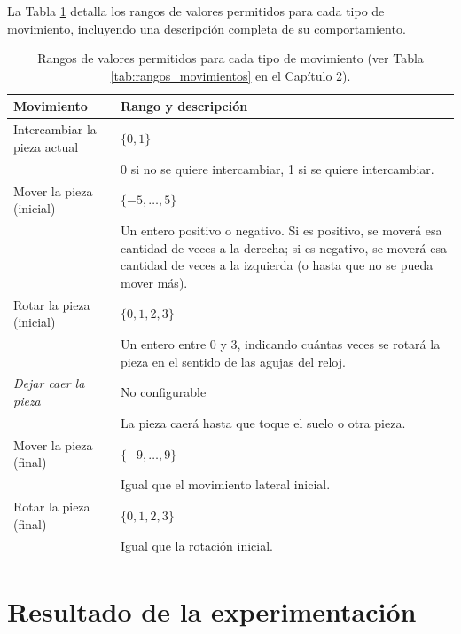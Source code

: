 \documentclass[11pt,spanish,listoffigures,listoftables]{tfgetsinf}
\begin{document}
La Tabla \ref{tab:rangos_movimientos_appendix} detalla los rangos de valores permitidos para cada tipo de movimiento, incluyendo una descripción completa de su comportamiento.

\begin{table}[H]
    \centering
    \begin{tabular}{lp{8cm}}
        \toprule
        \textbf{Movimiento} & \textbf{Rango y descripción} \\
        \midrule
        Intercambiar la pieza actual & $\{0, 1\}$ \\ 
        & 0 si no se quiere intercambiar, 1 si se quiere intercambiar. \\
        \midrule
        Mover la pieza (inicial) & $\{-5, \dots, 5\}$ \\ 
        & Un entero positivo o negativo. Si es positivo, se moverá esa cantidad de veces a la derecha; si es negativo, se moverá esa cantidad de veces a la izquierda (o hasta que no se pueda mover más). \\
        \midrule
        Rotar la pieza (inicial) & $\{0, 1, 2, 3\}$ \\ 
        & Un entero entre 0 y 3, indicando cuántas veces se rotará la pieza en el sentido de las agujas del reloj. \\
        \midrule
        \textit{Dejar caer la pieza} & No configurable \\ 
        & La pieza caerá hasta que toque el suelo o otra pieza. \\
        \midrule
        Mover la pieza (final) & $\{-9, \dots, 9\}$ \\ 
        & Igual que el movimiento lateral inicial. \\
        \midrule
        Rotar la pieza (final) & $\{0, 1, 2, 3\}$ \\ 
        & Igual que la rotación inicial. \\
        \bottomrule
    \end{tabular}
    \caption{Rangos de valores permitidos para cada tipo de movimiento (ver Tabla \ref{tab:rangos_movimientos} en el Capítulo 2).}
    \label{tab:rangos_movimientos_appendix}

\end{table}

\chapter{Resultado de la experimentación}
\label{appendix:resultados_experimentacion}
\end{document}
